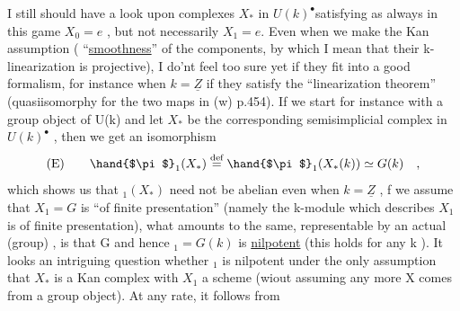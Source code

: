 I still should have a look upon complexes $X_*$ in $U(k)^\bullet$\hand{/}satisfying
\hand{(}as always in this game\hand{)} $X_0=e$ , but not necessarily $X_1 = e$. Even when
we make the Kan assumption ( ``\uline{smoothness}'' of the components,
by which I mean that their k-linearization is projective), I do'nt feel
too sure yet if they fit into a good formalism, for instance \hand{(}when $k=\underline{Z}$\hand{)}
if they satisfy the ``linearization theorem'' (quasiisomorphy for the two
maps in (w) p.454). If we start for instance with a group object of U(k)
and let $X_*$ be the corresponding semisimplicial complex in $U(k)^\bullet$ , then
we get an isomorphism
\[ \text{(E)} \qquad \hand{$\pi$}_1(X_*) \overset{\text{def}}{=} \hand{$\pi$}_1(X_*(k)) \simeq G(k) \quad , \]
which shows us that \hand{$\pi$}$_1(X_*)$ need not be abelian even when $k=\underline{Z}$ , 
 f we assume that $X_1 = G$ is ``of finite presentation''
(namely the  k-module which describes $X_1$ is of finite presentation), 
what amounts to the same, representable by an actual (group) , 
is  that G and hence \hand{$\pi$}$_1 = G(k)$ is \uline{nilpotent} (this holds for any k ).
It looks an intriguing question whether \hand{$\pi$}$_1$ is nilpotent under the only
assumption that $X_*$ is a  Kan complex with $X_1$ a scheme (wiout assuming
any more X comes from a group object). At any rate, it follows from

